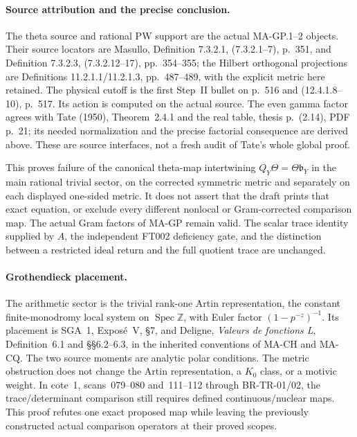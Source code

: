 \paragraph{Source attribution and the precise conclusion.}
The theta source and rational PW support are the actual
MA-GP.1--2 objects. Their source locators are Masullo,
Definition 7.3.2.1, (7.3.2.1--7), p.~351, and
Definition 7.3.2.3, (7.3.2.12--17), pp.~354--355;
the Hilbert orthogonal projections are Definitions
11.2.1.1/11.2.1.3, pp.~487--489, with the explicit
metric here retained. The physical cutoff is the
first Step~II bullet on p.~516 and (12.4.1.8--10),
p.~517. Its action is computed on the actual source.
The even gamma factor agrees with Tate (1950),
Theorem~2.4.1 and the real table, thesis p.~(2.14),
PDF p.~21; its needed normalization and the precise
factorial consequence are derived above. These
are source interfaces, not a fresh audit of Tate's
whole global proof.

This proves failure of the canonical theta-map
intertwining $Q_Y\Theta=\Theta\mathfrak b_Y$ in the
main rational trivial sector, on the corrected
symmetric metric and separately on each displayed
one-sided metric. It does not assert that the draft
prints that exact equation, or exclude every different
nonlocal or Gram-corrected comparison map. The actual
Gram factors of MA-GP remain valid. The scalar trace
identity supplied by $A$, the independent FT002
deficiency gate, and the distinction between a
restricted ideal return and the full quotient trace
are unchanged.

\paragraph{Grothendieck placement.}
The arithmetic sector is the trivial rank-one Artin
representation, the constant finite-monodromy local
system on $\operatorname{Spec}\mathbb Z$, with Euler
factor $(1-p^{-z})^{-1}$. Its placement is SGA~1,
Expos\'e~V, \S7, and Deligne, \emph{Valeurs de fonctions L},
Definition~6.1 and \S\S6.2--6.3, in the inherited
conventions of MA-CH and MA-CQ. The two source moments
are analytic polar conditions. The metric obstruction
does not change the Artin representation, a $K_0$
class, or a motivic weight. In cote~1, scans~079--080
and~111--112 through BR-TR-01/02, the trace/determinant
comparison still requires defined continuous/nuclear
maps. This proof refutes one exact proposed map while
leaving the previously constructed actual comparison
operators at their proved scopes.
